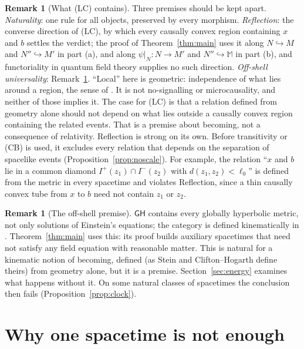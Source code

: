 \documentclass[11pt]{article}
\theoremstyle{definition}
\newtheorem{remark}[theorem]{Remark}
\newcommand{\GH}{\mathsf{GH}}
\newcommand{\Mink}{\mathbb M}
\newcommand{\Ifut}{I^{+}}
\newcommand{\Ichr}{I^{-}}
\begin{document}
\begin{remark}[What (LC) contains]\label{rem:lc}
Three premises should be kept apart. \emph{Naturality}: one rule for all
objects, preserved by every morphism. \emph{Reflection}: the converse
direction of (LC), by which every causally convex region containing $x$ and
$b$ settles the verdict; the proof of Theorem~\ref{thm:main} uses it along $N\hookrightarrow M$ and $N''\hookrightarrow M'$ in part (a), and along $\psi|_N:N\to M'$ and $N''\hookrightarrow\Mink$ in part (b), and functoriality in quantum
field theory supplies no such direction. \emph{Off-shell universality}:
Remark~\ref{rem:offshell}. ``Local'' here is geometric: independence of what
lies around a region, the sense of \citet[\S1]{BFV2003}. It is not
no-signalling or microcausality, and neither of those implies it. The case for
(LC) is that a relation defined from geometry alone should not depend on what
lies outside a causally convex region containing the related events. That is
a premise about becoming, not a consequence of relativity. Reflection is
strong on its own. Before transitivity or (CB) is used, it excludes every
relation that depends on the separation of spacelike events
(Proposition~\ref{prop:noscale}). For example, the relation ``$x$ and $b$ lie
in a common diamond $\Ifut(z_1)\cap\Ichr(z_2)$ with $d(z_1,z_2)<\ell_0$'' is
defined from the metric in every spacetime and violates Reflection, since a
thin causally convex tube from $x$ to $b$ need not contain $z_1$ or $z_2$.
\end{remark}

\begin{remark}[The off-shell premise]\label{rem:offshell}
$\GH$ contains every globally hyperbolic metric, not only solutions of
Einstein's equations; the category is defined kinematically in
\citep{BFV2003,FV2012}. Theorem~\ref{thm:main} uses this: its proof builds
auxiliary spacetimes that need not satisfy any field equation with reasonable
matter. This is natural for a kinematic notion of becoming, defined (as Stein
and Clifton--Hogarth define theirs) from geometry alone, but it is a premise.
Section~\ref{sec:energy} examines what happens without it. On some natural
classes of spacetimes the conclusion then fails
(Proposition~\ref{prop:clock}).
\end{remark}

\section{Why one spacetime is not enough}\label{sec:single}
\end{document}
